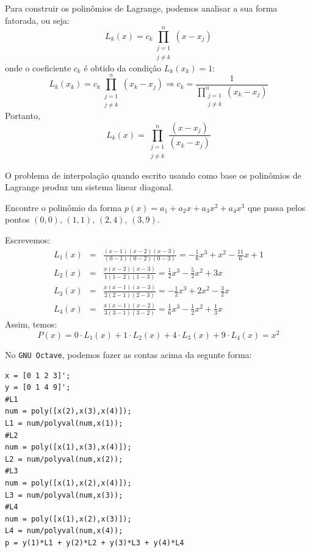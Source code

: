 Para construir os polinômios de Lagrange, podemos analisar a sua forma fatorada, ou seja:
\begin{equation} L_k(x)=c_k\prod_{\substack{j=1\\j\ne k}}^{n} (x-x_j) \end{equation}
onde o coeficiente $c_k$ é obtido da condição $L_k(x_k)=1$:
\begin{equation} L_k(x_k)=c_k\prod_{\substack{j=1\\j\ne k}}^{n} (x_k-x_j) \Longrightarrow  c_k=\frac{1}{\displaystyle \prod_{\substack{j=1\\j\ne k}}^{n} (x_k-x_j)} \end{equation}
Portanto,
\begin{equation} L_k(x)=\prod_{\substack{j=1\\j\ne k}}^{n} \frac{(x-x_j)}{(x_k-x_j)} \end{equation}

\begin{obs} O problema de interpolação quando escrito usando como base os polinômios de Lagrange produz um sistema linear diagonal.
\end{obs}

\begin{ex}
  Encontre o polinômio da forma $p(x)=a_1+a_2x+a_3x^2+a_4x^3$ que passa pelos pontos $(0, 0)$, $(1, 1)$, $(2, 4)$, $(3, 9)$.
\end{ex}
\begin{sol}
Escrevemos:
\begin{eqnarray}
  L_1(x)&=& \frac{(x-1)(x-2)(x-3)}{(0-1)(0-2)(0-3)}=-\frac{1}{6}x^3+x^2-\frac{11}{6}x+1\\
  L_2(x)&=& \frac{x(x-2)(x-3)}{1(1-2)(1-3)}=\frac{1}{2}x^3-\frac{5}{2}x^2+3x\\
  L_3(x)&=& \frac{x(x-1)(x-3)}{2(2-1)(2-3)}=-\frac{1}{2}x^3+2x^2-\frac{3}{2}x\\
  L_4(x)&=& \frac{x(x-1)(x-2)}{3(3-1)(3-2)}=\frac{1}{6}x^3-\frac{1}{2}x^2+\frac{1}{3}x
\end{eqnarray}
Assim, temos:
\begin{equation}
  P(x)=0\cdot L_1(x)+1\cdot L_2(x)+4\cdot L_3(x)+9\cdot L_4(x)=x^2
\end{equation}

\ifisoctave
No \verb+GNU Octave+, podemos fazer as contas acima da segunte forma:
\begin{verbatim}
x = [0 1 2 3]';
y = [0 1 4 9]';
#L1
num = poly([x(2),x(3),x(4)]);
L1 = num/polyval(num,x(1));
#L2
num = poly([x(1),x(3),x(4)]);
L2 = num/polyval(num,x(2));
#L3
num = poly([x(1),x(2),x(4)]);
L3 = num/polyval(num,x(3));
#L4
num = poly([x(1),x(2),x(3)]);
L4 = num/polyval(num,x(4));
p = y(1)*L1 + y(2)*L2 + y(3)*L3 + y(4)*L4
\end{verbatim}
\fi
\end{sol}

